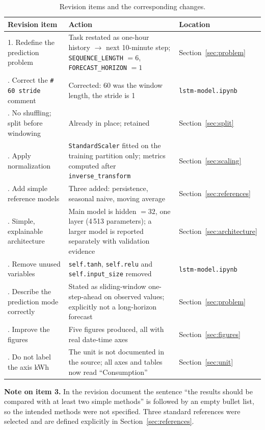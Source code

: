 \documentclass[11pt,a4paper]{article}
\begin{document}
\begin{table}[H]
\centering
\small
\begin{tabular}{p{}p{}p{}}
\toprule
\textbf{Revision item} & \textbf{Action} & \textbf{Location} \\
\midrule
1. Redefine the prediction problem &
Task restated as one-hour history $\rightarrow$ next 10-minute step;
\texttt{SEQUENCE\_LENGTH} $=6$, \texttt{FORECAST\_HORIZON} $=1$ &
Section~\ref{sec:problem} \\
\addlinespace
1. Correct the \texttt{\# 60 stride} comment &
Corrected: 60 was the window length, the stride is 1 &
\texttt{lstm-model.ipynb} \\
\addlinespace
1. No shuffling; split before windowing &
Already in place; retained &
Section~\ref{sec:split} \\
\addlinespace
2. Apply normalization &
\texttt{StandardScaler} fitted on the training partition only; metrics computed after
\texttt{inverse\_transform} &
Section~\ref{sec:scaling} \\
\addlinespace
3. Add simple reference models &
Three added: persistence, seasonal naive, moving average &
Section~\ref{sec:references} \\
\addlinespace
4. Simple, explainable architecture &
Main model is hidden $=32$, one layer (4\,513 parameters); a larger model is reported
separately with validation evidence &
Section~\ref{sec:architecture} \\
\addlinespace
4. Remove unused variables &
\texttt{self.tanh}, \texttt{self.relu} and \texttt{self.input\_size} removed &
\texttt{lstm-model.ipynb} \\
\addlinespace
5. Describe the prediction mode correctly &
Stated as sliding-window one-step-ahead on observed values; explicitly not a long-horizon
forecast &
Section~\ref{sec:problem} \\
\addlinespace
6. Improve the figures &
Five figures produced, all with real date-time axes &
Section~\ref{sec:figures} \\
\addlinespace
6. Do not label the axis kWh &
The unit is not documented in the source; all axes and tables now read ``Consumption'' &
Section~\ref{sec:unit} \\
\bottomrule
\end{tabular}
\caption{Revision items and the corresponding changes.}
\end{table}

\noindent
\textbf{Note on item 3.} In the revision document the sentence ``the results should be compared
with at least two simple methods'' is followed by an empty bullet list, so the intended methods
were not specified. Three standard references were selected and are defined explicitly in
Section~\ref{sec:references}.
\end{document}
